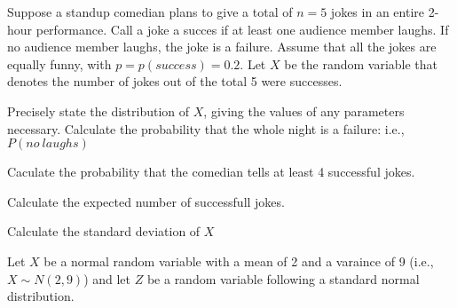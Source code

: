 \documentclass[addpoints]{examsetup}
\begin{document}




\examCoverPage

\begin{questions}
\question
Suppose a standup comedian plans to give a total of $n= 5$ jokes in an entire 2-hour performance. Call a joke a succes if at least one audience member laughs. If no audience member laughs, the joke is a failure. Assume that all the jokes are equally funny, with $p= p(success)= 0.2$. Let $X$ be the random variable that denotes the number of jokes out of the total 5 were successes. 
\begin{parts}
      \subpart[3] Precisely state the distribution of $X$, giving the values of any parameters necessary.\vspace{2cm}
      \subpart[3] Calculate the probability that the whole night is a failure: i.e., $P(no\ laughs)$\vspace{3cm}
      
      \subpart[3] Caculate the probability that the comedian tells at least 4 successful jokes.\vspace{3cm}
      
      \subpart[3] Calculate the expected number of successfull jokes. \vspace{2cm}
      
      \subpart[3] Calculate the standard deviation of $X$\vspace{2cm}

\end{parts}

\pagebreak

\question
Let $X$ be a normal random variable with a mean of 2 and a varaince of 9 (i.e., $X \sim N(2,9)$) and let $Z$ be a random variable following a standard normal distribution.

\end{questions}
\end{document}
